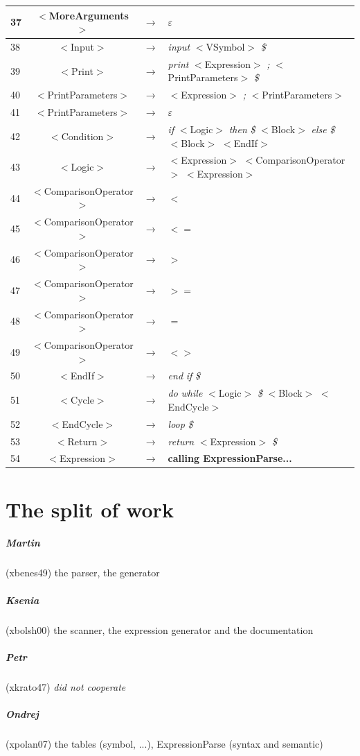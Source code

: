 \documentclass[10pt,a4paper,titlepage]{article}
\begin{document}
{\begin{center}
\begin{tabular}{ | l | c  c  l | }
      37 & $<$MoreArguments$>$            & $\rightarrow$ & $\varepsilon$ \\ \hline
      38 & $<$Input$>$                    & $\rightarrow$ & {\it input} $<$VSymbol$>$ {\it \$} \\ \hline
      39 & $<$Print$>$                    & $\rightarrow$ & {\it print} $<$Expression$>$ {\it ;} $<$PrintParameters$>$ {\it \$} \\ \hline
      40 & $<$PrintParameters$>$          & $\rightarrow$ & $<$Expression$>$ {\it ;} $<$PrintParameters$>$ \\ \hline
      41 & $<$PrintParameters$>$          & $\rightarrow$ & $\varepsilon$ \\ \hline
      42 & $<$Condition$>$                & $\rightarrow$ & {\it if} $<$Logic$>$ {\it then} {\it \$} $<$Block$>$ {\it else} {\it \$} $<$Block$>$ $<$EndIf$>$ \\ \hline
      43 & $<$Logic$>$                    & $\rightarrow$ & $<$Expression$>$ $<$ComparisonOperator$>$ $<$Expression$>$ \\ \hline
      44 & $<$ComparisonOperator$>$       & $\rightarrow$ & {\it $<$} \\ \hline
      45 & $<$ComparisonOperator$>$       & $\rightarrow$ & {\it $<=$} \\ \hline
      46 & $<$ComparisonOperator$>$       & $\rightarrow$ & {\it $>$} \\ \hline
      47 & $<$ComparisonOperator$>$       & $\rightarrow$ & {\it $>=$} \\ \hline
      48 & $<$ComparisonOperator$>$       & $\rightarrow$ & {\it $=$} \\ \hline
      49 & $<$ComparisonOperator$>$       & $\rightarrow$ & {\it $<>$} \\ \hline
      50 & $<$EndIf$>$                    & $\rightarrow$ & {\it end} {\it if} {\it \$} \\ \hline
      51 & $<$Cycle$>$                    & $\rightarrow$ & {\it do} {\it while} $<$Logic$>$ {\it \$} $<$Block$>$ $<$EndCycle$>$ \\ \hline
      52 & $<$EndCycle$>$                 & $\rightarrow$ & {\it loop} {\it \$} \\ \hline
      53 & $<$Return$>$                   & $\rightarrow$ & {\it return} $<$Expression$>$ {\it \$} \\ \hline
      54 & $<$Expression$>$               & $\rightarrow$ & {\bf calling ExpressionParse...} \\ \hline
    \end{tabular}
  \end{center}
}

\newpage

\section{The split of work}
\subparagraph{Martin} (xbenes49) the parser, the generator
\subparagraph{Ksenia} (xbolsh00) the scanner, the expression generator and the documentation
\subparagraph{Petr} (xkrato47) {\it did not cooperate}
\subparagraph{Ondrej} (xpolan07) the tables (symbol, ...), ExpressionParse (syntax and semantic)
\end{document}
